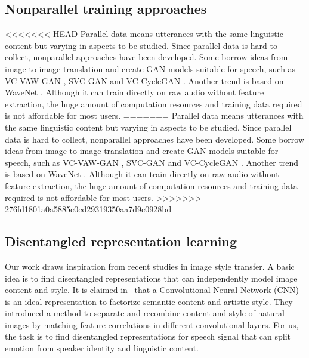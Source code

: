\documentclass{article}
\begin{document}
\subsection{Nonparallel training approaches}
<<<<<<< HEAD
Parallel data means utterances with the same linguistic content but varying in aspects to be studied. Since parallel data is hard to collect, nonparallel approaches have been developed. Some borrow ideas from image-to-image translation \cite{NIPS2017_6672} and create GAN models \cite{goodfellow2014generative} suitable for speech, such as VC-VAW-GAN \cite{Hsu2017}, SVC-GAN \cite{Kaneko2017} and VC-CycleGAN \cite{fang2018high}. Another trend is based on WaveNet \cite{van2016wavenet}. Although it can train directly on raw audio without feature extraction, the huge amount of computation resources and training data required is not affordable for most users.
=======
Parallel data means utterances with the same linguistic content but varying in aspects to be studied. Since parallel data is hard to collect, nonparallel approaches have been developed. Some borrow ideas from image-to-image translation \cite{NIPS2017_6672} and create GAN models \cite{goodfellow2014generative} suitable for speech, such as VC-VAW-GAN \cite{Hsu2017}, SVC-GAN \cite{Kaneko2017} and VC-CycleGAN \cite{fang2018high}. Another trend is based on WaveNet \cite{van2016wavenet,tamamori2017speaker}. Although it can train directly on raw audio without feature extraction, the huge amount of computation resources and training data required is not affordable for most users.
>>>>>>> 276fd1801a0a5885c0cd29319350aa7d9c0928bd



\subsection{Disentangled representation learning}
Our work draws inspiration from recent studies in image style transfer. A basic idea is to find disentangled representations that can independently model image content and style. It is claimed in~\cite{gatys2016image} that a Convolutional Neural Network (CNN) is an ideal representation to factorize semantic content and artistic style. They introduced a method to separate and recombine content and style of natural images by matching feature correlations in different convolutional layers. For us, the task is to find disentangled representations for speech signal that can split emotion from speaker identity and linguistic content.
\end{document}
